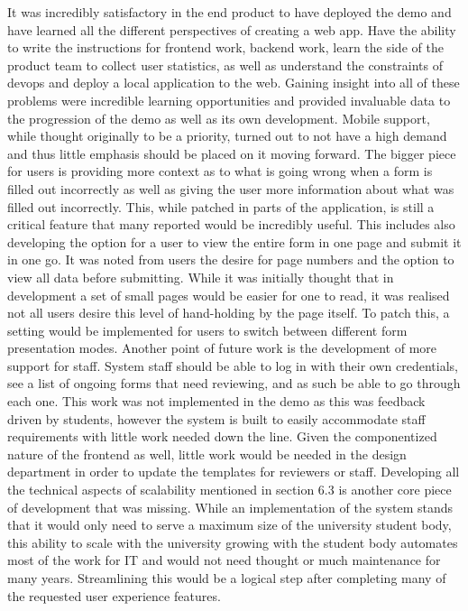 It was incredibly satisfactory in the end product to have deployed the demo and have learned all the different perspectives of creating a web app. Have the ability to write the instructions for frontend work, backend work, learn the side of the product team to collect user statistics, as well as understand the constraints of devops and deploy a local application to the web. Gaining insight into all of these problems were incredible learning opportunities and provided invaluable data to the progression of the demo as well as its own development.
\newline
\newline
Mobile support, while thought originally to be a priority, turned out to not have a high demand and thus little emphasis should be placed on it moving forward. The bigger piece for users is providing more context as to what is going wrong when a form is filled out incorrectly as well as giving the user more information about what was filled out incorrectly. This, while patched in parts of the application, is still a critical feature that many reported would be incredibly useful. This includes also developing the option for a user to view the entire form in one page and submit it in one go. It was noted from users the desire for page numbers and the option to view all data before submitting. While it was initially thought that in development a set of small pages would be easier for one to read, it was realised not all users desire this level of hand-holding by the page itself. To patch this, a setting would be implemented for users to switch between different form presentation modes.
\newline
\newline
Another point of future work is the development of more support for staff. System staff should be able to log in with their own credentials, see a list of ongoing forms that need reviewing, and as such be able to go through each one. This work was not implemented in the demo as this was feedback driven by students, however the system is built to easily accommodate staff requirements with little work needed down the line. Given the componentized nature of the frontend as well, little work would be needed in the design department in order to update the templates for reviewers or staff.
\newline
\newline
Developing all the technical aspects of scalability mentioned in section 6.3 is another core piece of development that was missing. While an implementation of the system stands that it would only need to serve a maximum size of the university student body, this ability to scale with the university growing with the student body automates most of the work for IT and would not need thought or much maintenance for many years. Streamlining this would be a logical step after completing many of the requested user experience features.